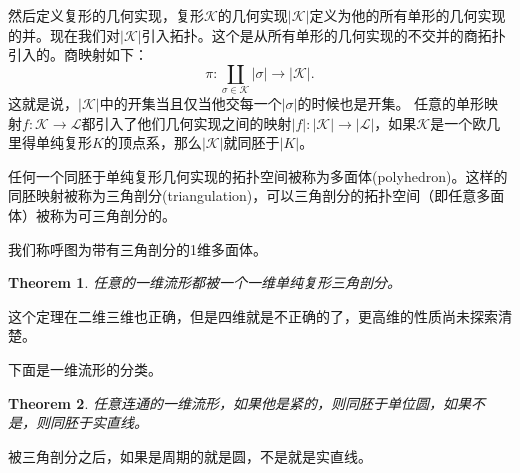 \documentclass[10pt]{book}
\theoremstyle{plain}%
\newtheorem{theo}{Theorem}%
\begin{document}
然后定义复形的几何实现，复形$\mathcal{K}$的几何实现$|\mathcal{K}|$定义为他的所有单形的几何实现的并。现在我们对$|\mathcal{K}|$引入拓扑。这个是从所有单形的几何实现的不交并的商拓扑引入的。商映射如下：
\[\pi:\coprod_{\sigma\in\mathcal{K}}|\sigma|\to|\mathcal{K}|.\] 
这就是说，$|\mathcal{K}|$中的开集当且仅当他交每一个$|\sigma|$的时候也是开集。
任意的单形映射$f:\mathcal{K}\to \mathcal{L}$都引入了他们几何实现之间的映射$|f|:|\mathcal{K}|\to |\mathcal{L}|$，如果$\mathcal{K}$是一个欧几里得单纯复形$K$的顶点系，那么$|\mathcal{K}|$就同胚于$|K|$。

任何一个同胚于单纯复形几何实现的拓扑空间被称为多面体(polyhedron)。这样的同胚映射被称为三角剖分(triangulation)，可以三角剖分的拓扑空间（即任意多面体）被称为可三角剖分的。

我们称呼图为带有三角剖分的1维多面体。

\begin{theo}
任意的一维流形都被一个一维单纯复形三角剖分。
\end{theo}
这个定理在二维三维也正确，但是四维就是不正确的了，更高维的性质尚未探索清楚。

下面是一维流形的分类。

\begin{theo}
任意连通的一维流形，如果他是紧的，则同胚于单位圆，如果不是，则同胚于实直线。
\end{theo}
被三角剖分之后，如果是周期的就是圆，不是就是实直线。
\end{document}
